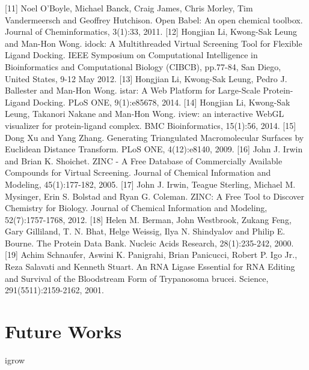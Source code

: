 [11] 	Noel O'Boyle, Michael Banck, Craig James, Chris Morley, Tim Vandermeersch and Geoffrey Hutchison. Open Babel: An open chemical toolbox. Journal of Cheminformatics, 3(1):33, 2011.
[12] 	Hongjian Li, Kwong-Sak Leung and Man-Hon Wong. idock: A Multithreaded Virtual Screening Tool for Flexible Ligand Docking. IEEE Symposium on Computational Intelligence in Bioinformatics and Computational Biology (CIBCB), pp.77-84, San Diego, United States, 9-12 May 2012.
[13] 	Hongjian Li, Kwong-Sak Leung, Pedro J. Ballester and Man-Hon Wong. istar: A Web Platform for Large-Scale Protein-Ligand Docking. PLoS ONE, 9(1):e85678, 2014.
[14] 	Hongjian Li, Kwong-Sak Leung, Takanori Nakane and Man-Hon Wong. iview: an interactive WebGL visualizer for protein-ligand complex. BMC Bioinformatics, 15(1):56, 2014.
[15] 	Dong Xu and Yang Zhang. Generating Triangulated Macromolecular Surfaces by Euclidean Distance Transform. PLoS ONE, 4(12):e8140, 2009.
[16] 	John J. Irwin and Brian K. Shoichet. ZINC - A Free Database of Commercially Available Compounds for Virtual Screening. Journal of Chemical Information and Modeling, 45(1):177-182, 2005.
[17] 	John J. Irwin, Teague Sterling, Michael M. Mysinger, Erin S. Bolstad and Ryan G. Coleman. ZINC: A Free Tool to Discover Chemistry for Biology. Journal of Chemical Information and Modeling, 52(7):1757-1768, 2012.
[18] 	Helen M. Berman, John Westbrook, Zukang Feng, Gary Gilliland, T. N. Bhat, Helge Weissig, Ilya N. Shindyalov and Philip E. Bourne. The Protein Data Bank. Nucleic Acids Research, 28(1):235-242, 2000.
[19] 	Achim Schnaufer, Aswini K. Panigrahi, Brian Panicucci, Robert P. Igo Jr., Reza Salavati and Kenneth Stuart. An RNA Ligase Essential for RNA Editing and Survival of the Bloodstream Form of Trypanosoma brucei. Science, 291(5511):2159-2162, 2001.

\section{Future Works}

igrow

\chapterend
